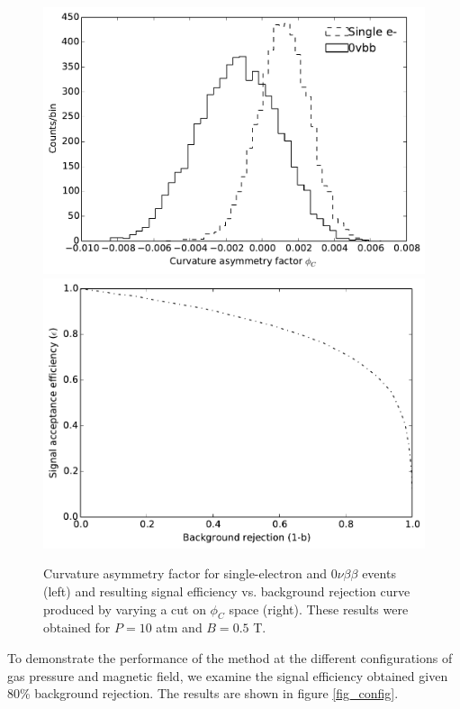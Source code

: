 \documentclass{JINST}
\begin{document}
\begin{figure}[!htb]
	\includegraphics[scale=0.44]{fig/10atm_05T_scurv_diff_means.pdf}
	\includegraphics[scale=0.44]{fig/10atm_05T_sigvsb_all.pdf}
	\caption{\label{fig_svsbg}Curvature asymmetry factor for single-electron and $0\nu\beta\beta$ events (left) and resulting signal efficiency vs. background rejection curve produced by varying a cut on $\phi_{C}$ space (right).  These results were obtained for $P = 10$ atm and $B = 0.5$ T.}
\end{figure}

To demonstrate the performance of the method at the different configurations of gas pressure and magnetic field, we examine the signal efficiency obtained given 80\% background rejection.  The results are shown in figure \ref{fig_config}.
\end{document}
